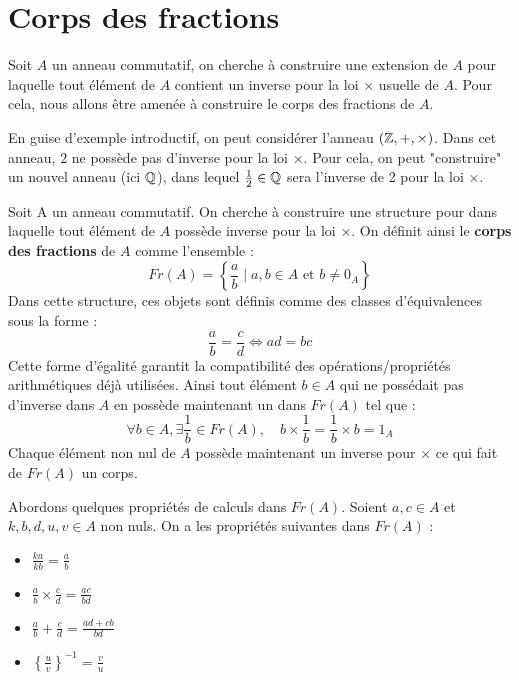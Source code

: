 
\section{Corps des fractions}

Soit $A$ un anneau commutatif, on cherche à construire une extension de $A$ pour laquelle tout élément de $A$ 
contient un inverse pour la loi $\times$ usuelle de $A$. 
Pour cela, nous allons être amenée à construire le corps des fractions de $A$. 

\vspace{0.3cm}

En guise d'exemple introductif, on peut considérer l'anneau $(\mathbb{Z},+,\times)$. 
Dans cet anneau, $2$ ne possède pas d'inverse pour la loi $\times$. 
Pour cela, on peut "construire" un nouvel anneau (ici $\mathbb{Q}$), dans lequel $ \frac{1}{2} \in \mathbb{Q}$ sera l'inverse de 2 
pour la loi $\times$. 

\begin{proposition}
    Soit A un anneau commutatif. On cherche à construire une structure pour dans laquelle tout élément de $A$ possède 
    inverse pour la loi $\times$. 
    On définit ainsi le \textbf{corps des fractions} de $A$ comme l'ensemble : 
        \[ \boxed{ Fr(A) = \left\{ \frac{a}{b} \; | \; a,b \in A \text{ et } b \not = 0_A \right\} } \]
    Dans cette structure, ces objets sont définis comme des classes d'équivalences sous la forme : 
        \[ \frac{a}{b} = \frac{c}{d} \iff ad = bc \] 
    Cette forme d'égalité garantit la compatibilité des opérations/propriétés arithmétiques déjà utilisées. 
    Ainsi tout élément $b \in A$ qui ne possédait pas d'inverse dans $A$ en possède maintenant un dans $Fr(A)$ tel que :
        \[ \forall b \in A, \exists \frac{1}{b} \in Fr(A), \quad b \times \frac{1}{b} = \frac{1}{b} \times b = 1_A \] 
    Chaque élément non nul de $A$ possède maintenant un inverse pour $\times$ ce qui fait de $Fr(A)$ un corps. 
\end{proposition}

\newpage

\begin{prop}[Calculs]
    Abordons quelques propriétés de calculs dans $Fr(A)$. Soient $a,c \in A$ et $k,b,d,u,v \in A$ non nuls. 
    On a les propriétés suivantes dans $Fr(A)$ : 
    \begin{itemize}
        \item $ \frac{ka}{kb} = \frac{a}{b} $ 
        \item $ \frac{a}{b} \times \frac{c}{d} = \frac{ac}{bd} $ 
        \item $ \frac{a}{b} + \frac{c}{d} = \frac{ad + cb}{bd} $ 
        \item $ \left\{ \frac{u}{v} \right\} ^{-1} = \frac{v}{u} $
    \end{itemize}
\end{prop}

